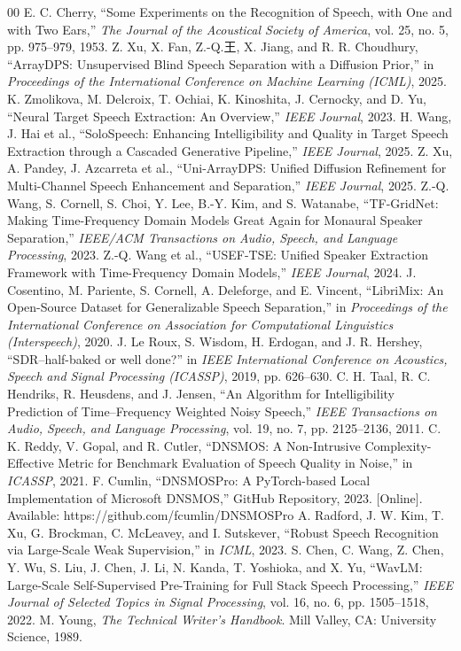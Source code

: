 \documentclass[conference]{IEEEtran}
\begin{document}
\begin{thebibliography}{00}
 E. C. Cherry, ``Some Experiments on the Recognition of Speech, with One and with Two Ears,'' \textit{The Journal of the Acoustical Society of America}, vol. 25, no. 5, pp. 975--979, 1953.
 Z. Xu, X. Fan, Z.-Q.王, X. Jiang, and R. R. Choudhury, ``ArrayDPS: Unsupervised Blind Speech Separation with a Diffusion Prior,'' in \textit{Proceedings of the International Conference on Machine Learning (ICML)}, 2025.
 K. Zmolikova, M. Delcroix, T. Ochiai, K. Kinoshita, J. Cernocky, and D. Yu, ``Neural Target Speech Extraction: An Overview,'' \textit{IEEE Journal}, 2023.
 H. Wang, J. Hai et al., ``SoloSpeech: Enhancing Intelligibility and Quality in Target Speech Extraction through a Cascaded Generative Pipeline,'' \textit{IEEE Journal}, 2025.
 Z. Xu, A. Pandey, J. Azcarreta et al., ``Uni-ArrayDPS: Unified Diffusion Refinement for Multi-Channel Speech Enhancement and Separation,'' \textit{IEEE Journal}, 2025.
 Z.-Q. Wang, S. Cornell, S. Choi, Y. Lee, B.-Y. Kim, and S. Watanabe, ``TF-GridNet: Making Time-Frequency Domain Models Great Again for Monaural Speaker Separation,'' \textit{IEEE/ACM Transactions on Audio, Speech, and Language Processing}, 2023.
 Z.-Q. Wang et al., ``USEF-TSE: Unified Speaker Extraction Framework with Time-Frequency Domain Models,'' \textit{IEEE Journal}, 2024.
 J. Cosentino, M. Pariente, S. Cornell, A. Deleforge, and E. Vincent, ``LibriMix: An Open-Source Dataset for Generalizable Speech Separation,'' in \textit{Proceedings of the International Conference on Association for Computational Linguistics (Interspeech)}, 2020.
 J. Le Roux, S. Wisdom, H. Erdogan, and J. R. Hershey, ``SDR--half-baked or well done?'' in \textit{IEEE International Conference on Acoustics, Speech and Signal Processing (ICASSP)}, 2019, pp. 626--630.
 C. H. Taal, R. C. Hendriks, R. Heusdens, and J. Jensen, ``An Algorithm for Intelligibility Prediction of Time--Frequency Weighted Noisy Speech,'' \textit{IEEE Transactions on Audio, Speech, and Language Processing}, vol. 19, no. 7, pp. 2125--2136, 2011.
 C. K. Reddy, V. Gopal, and R. Cutler, ``DNSMOS: A Non-Intrusive Complexity-Effective Metric for Benchmark Evaluation of Speech Quality in Noise,'' in \textit{ICASSP}, 2021.
 F. Cumlin, ``DNSMOSPro: A PyTorch-based Local Implementation of Microsoft DNSMOS,'' GitHub Repository, 2023. [Online]. Available: https://github.com/fcumlin/DNSMOSPro
 A. Radford, J. W. Kim, T. Xu, G. Brockman, C. McLeavey, and I. Sutskever, ``Robust Speech Recognition via Large-Scale Weak Supervision,'' in \textit{ICML}, 2023.
 S. Chen, C. Wang, Z. Chen, Y. Wu, S. Liu, J. Chen, J. Li, N. Kanda, T. Yoshioka, and X. Yu, ``WavLM: Large-Scale Self-Supervised Pre-Training for Full Stack Speech Processing,'' \textit{IEEE Journal of Selected Topics in Signal Processing}, vol. 16, no. 6, pp. 1505--1518, 2022.
 M. Young, \textit{The Technical Writer's Handbook}. Mill Valley, CA: University Science, 1989.
\end{thebibliography}
\end{document}
